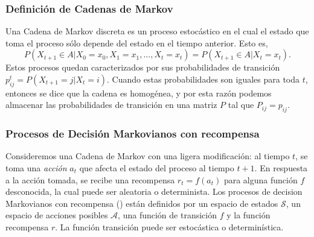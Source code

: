 \documentclass[11pt]{article}
\theoremstyle{plain}
\begin{document}
\subsubsection{Definición de Cadenas de Markov}
Una Cadena de Markov discreta es un proceso estocástico en el cual el estado que toma el proceso sólo depende del estado en el tiempo anterior. Esto es, 
\[P(X_{t+1} \in A | X_0=x_0, X_1=x_1 , ... , X_t=x_t) = P(X_{t+1} \in A | X_t = x_t).\]
Estos procesos quedan caracterizados por sus probabilidades de transición $p^t_{ij}=P(X_{t+1}=j | X_{t}=i)$. Cuando estas probabilidades son iguales para toda $t$, entonces se dice que la cadena es homogénea, y por esta razón podemos almacenar las probabilidades de transición en una matriz $P$ tal que $P_{ij}=p_{ij}$.
\subsubsection{Procesos de Decisión Markovianos con recompensa}
Consideremos una Cadena de Markov con una ligera modificación: al tiempo $t$, se toma una \textit{acción} $a_t$ que afecta el estado del proceso al tiempo $t+1$. En respuesta a la acción tomada, se recibe una recompensa $r_t = f(a_t)$ para alguna función $f$ desconocida, la cual puede ser aleatoria o determinista.
Los procesos de decision Markovianos con recompensa (\cite{Puterman:1994:MDP:528623}) están definidos por un espacio de estados $\mathcal{S}$, un espacio de acciones posibles $\mathcal{A}$, una función de transición $f$ y la función recompensa $r$. La función transición puede ser estocástica o determinística. 
\end{document}
